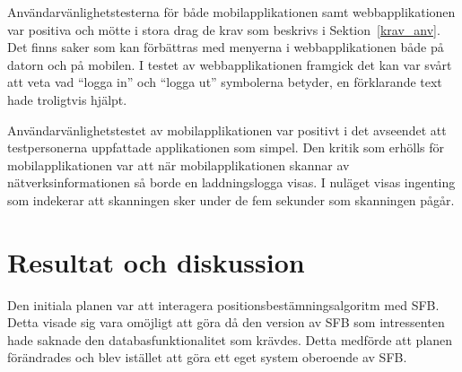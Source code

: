 \documentclass[a4paper,12pt]{article}
\begin{document}
 Användarvänlighetstesterna för både mobilapplikationen samt webbapplikationen var positiva och mötte i stora drag de krav som beskrivs i Sektion~\ref{krav_anv}. Det finns saker som kan förbättras med menyerna i webbapplikationen både på datorn och på mobilen. I testet av webbapplikationen framgick det kan var svårt att veta vad ``logga in'' och ``logga ut'' symbolerna betyder, en förklarande text hade troligtvis hjälpt.

 Användarvänlighetstestet av mobilapplikationen var positivt i det avseendet att testpersonerna uppfattade applikationen som simpel. Den kritik som erhölls för mobilapplikationen var att när mobilapplikationen skannar av nätverksinformationen så borde en laddningslogga visas. I nuläget visas ingenting som indekerar att skanningen sker under de fem sekunder som skanningen pågår.


 \section{Resultat och diskussion}\label{resultat}

 Den initiala planen var att interagera positionsbestämningsalgoritm med SFB. Detta visade sig vara omöjligt att göra då den version av SFB som intressenten hade saknade den databasfunktionalitet som krävdes. Detta medförde att planen förändrades och blev istället att göra ett eget system oberoende av SFB.
\end{document}
